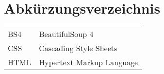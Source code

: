 
\cleardoublepage
{}
{}
\chapter*{Abkürzungsverzeichnis}
\label{section-abbrevs}

\begin{tabularx}{\textwidth}{lX}
  BS4 & BeautifulSoup 4\\
  CSS & Cascading Style Sheets\\
  HTML & Hypertext Markup Language
\end{tabularx}
